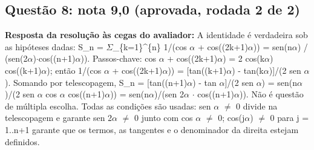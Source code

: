 \documentclass{article}%
\begin{document}
\subsection*{Questão 8: nota 9,0 (aprovada, rodada 2 de 2)}%
\textbf{Resposta da resolução às cegas do avaliador:} A identidade é verdadeira sob as hipóteses dadas:\newline%
\newline%
S\_n = $\Sigma$\_\{k=1\}\^{}\{n\} 1/(cos $\alpha$ + cos((2k+1)$\alpha$)) = sen(n$\alpha$) / (sen(2$\alpha$)$\cdot$cos((n+1)$\alpha$)).\newline%
\newline%
Passos{-}chave: cos $\alpha$ + cos((2k+1)$\alpha$) = 2 cos(k$\alpha$) cos((k+1)$\alpha$); então 1/(cos $\alpha$ + cos((2k+1)$\alpha$)) = {[}tan((k+1)$\alpha$) - tan(k$\alpha$){]}/(2 sen $\alpha$). Somando por telescopagem, S\_n = {[}tan((n+1)$\alpha$) - tan $\alpha${]}/(2 sen $\alpha$) = sen(n$\alpha$)/(2 sen $\alpha$ cos $\alpha$ cos((n+1)$\alpha$)) = sen(n$\alpha$)/(sen 2$\alpha$ $\cdot$ cos((n+1)$\alpha$)).\newline%
\newline%
Não é questão de múltipla escolha. Todas as condições são usadas: sen $\alpha$ $\neq$ 0 divide na telescopagem e garante sen 2$\alpha$ $\neq$ 0 junto com cos $\alpha$ $\neq$ 0; cos(j$\alpha$) $\neq$ 0 para j = 1..n+1 garante que os termos, as tangentes e o denominador da direita estejam definidos.\par %
\end{document}
